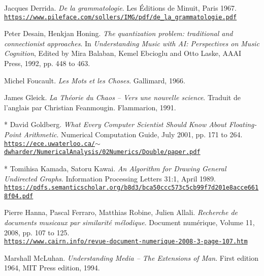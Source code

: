 \begin{thebibliography}{99}
	Jacques Derrida. \textit{De la grammatologie}. Les \'{E}ditions de Minuit, Paris 1967.\\ 
	\href{https://www.pileface.com/sollers/IMG/pdf/de\_la\_grammatologie.pdf}{\scriptsize{\texttt{https://www.pileface.com/sollers/IMG/pdf/de\_la\_grammatologie.pdf}}} \normalsize{}
	
	Peter Desain, Henkjan Honing. \textit{The quantization problem: traditional and connectionist approaches}. In \textit{Understanding Music with AI: Perspectives on Music Cognition}, Edited by Mira Balaban, Kemel Ebcioglu and Otto Laske, AAAI Press, 1992, pp. 448 to 463.
	
	Michel Foucault. \textit{Les Mots et les Choses}. Gallimard, 1966.

	James Gleick. \textit{La Th\'eorie du Chaos -- Vers une nouvelle science}. Traduit de l'anglais par Christian Feanmougin. Flammarion, 1991.
	
	 * David Goldberg. \textit{What Every Computer Scientist Should Know About Floating-Point Arithmetic}. Numerical Computation Guide, July 2001, pp. 171 to 264.\\ \href{https://ece.uwaterloo.ca/\~dwharder/NumericalAnalysis/02Numerics/Double/paper.pdf}{\scriptsize{\texttt{https://ece.uwaterloo.ca/$\sim$dwharder/NumericalAnalysis/02Numerics/Double/paper.pdf}}} \normalsize{}
	 
	 * Tomihisa Kamada, Satoru Kawai. \textit{An Algorithm for Drawing General Undirected Graphs}. Information Processing Letters 31:1, April 1989.\\ \href{https://pdfs.semanticscholar.org/b8d3/bca50ccc573c5cb99f7d201e8acce6618f04.pdf}{\scriptsize{\texttt{https://pdfs.semanticscholar.org/b8d3/bca50ccc573c5cb99f7d201e8acce6618f04.pdf}}} \normalsize{}
	 
	Pierre Hanna, Pascal Ferraro, Matthias Robine, Julien Allali. \textit{Recherche de documents musicaux par similarit\'{e} m\'{e}lodique}. Document num\'{e}rique, Volume 11, 2008, pp. 107 to 125.\\ 
	\href{https://www.cairn.info/revue-document-numerique-2008-3-page-107.htm}{\scriptsize{\texttt{https://www.cairn.info/revue-document-numerique-2008-3-page-107.htm}}} \normalsize{}
	 	 
	Marshall McLuhan. \textit{Understanding Media -- The Extensions of  Man}. First edition 1964, MIT Press edition, 1994.
		 

\end{thebibliography}
